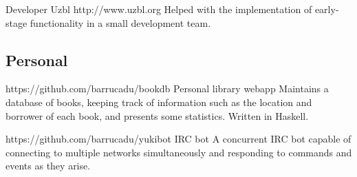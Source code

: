 \documentclass[a4paper,11pt,long]{cv}
\begin{document}
  {Developer}
  {Uzbl}
  {http://www.uzbl.org}
  {Helped with the implementation of early-stage functionality in a
    small development team.}

\vspace{0.2cm}
\subsection{Personal}

  {https://github.com/barrucadu/bookdb}
  {Personal library webapp}
  {Maintains a database of books, keeping track of information such as
    the location and borrower of each book, and presents some
    statistics. Written in Haskell.}

  {https://github.com/barrucadu/yukibot}
  {IRC bot}
  {A concurrent IRC bot capable of connecting to multiple
   networks simultaneously and responding to commands and events as
   they arise.}
\end{document}

